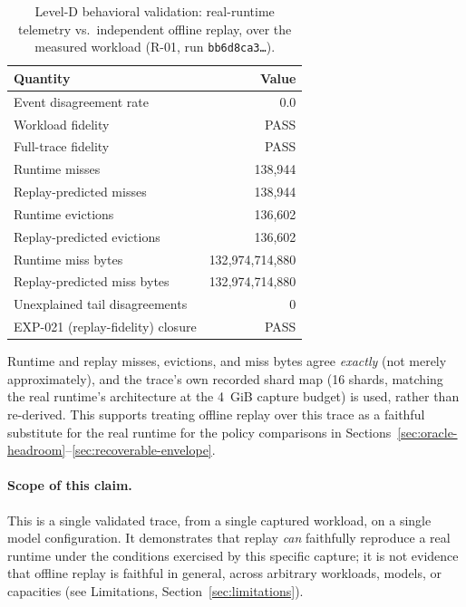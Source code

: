 \begin{table}[t]
\centering
\caption{Level-D behavioral validation: real-runtime telemetry vs.\
independent offline replay, over the measured workload (R-01, run
\texttt{bb6d8ca3\ldots}).}
\label{tab:level-d}
\small
\begin{tabular}{@{}lr@{}}
\toprule
Quantity & Value \\
\midrule
Event disagreement rate & 0.0 \\
Workload fidelity & PASS \\
Full-trace fidelity & PASS \\
Runtime misses & 138{,}944 \\
Replay-predicted misses & 138{,}944 \\
Runtime evictions & 136{,}602 \\
Replay-predicted evictions & 136{,}602 \\
Runtime miss bytes & 132{,}974{,}714{,}880 \\
Replay-predicted miss bytes & 132{,}974{,}714{,}880 \\
Unexplained tail disagreements & 0 \\
EXP-021 (replay-fidelity) closure & PASS \\
\bottomrule
\end{tabular}
\end{table}

Runtime and replay misses, evictions, and miss bytes agree \emph{exactly}
(not merely approximately), and the trace's own recorded shard map
(16 shards, matching the real runtime's architecture at the 4~GiB
capture budget) is used, rather than re-derived. This supports treating
offline replay over this trace as a faithful substitute for the real
runtime for the policy comparisons in
Sections~\ref{sec:oracle-headroom}--\ref{sec:recoverable-envelope}.

\paragraph{Scope of this claim.} This is a single validated trace, from a
single captured workload, on a single model configuration. It
demonstrates that replay \emph{can} faithfully reproduce a real runtime
under the conditions exercised by this specific capture; it is not
evidence that offline replay is faithful in general, across arbitrary
workloads, models, or capacities (see Limitations,
Section~\ref{sec:limitations}).

